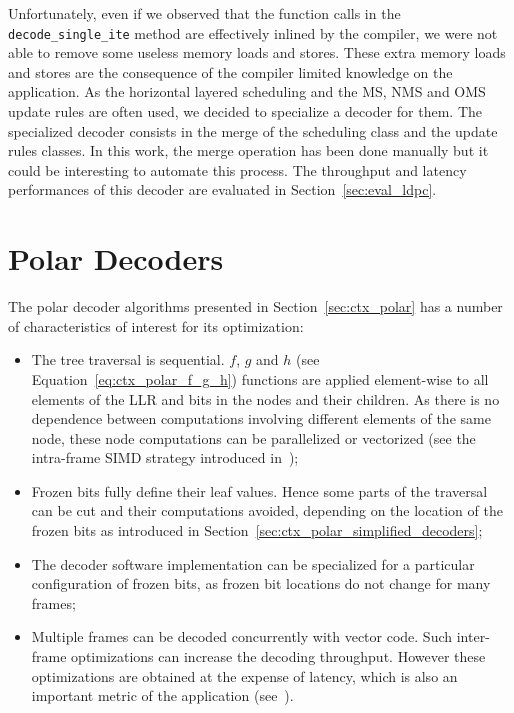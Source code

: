 Unfortunately, even if we observed that the function calls in the
\verb|decode_single_ite| method are effectively inlined by the compiler, we were
not able to remove some useless memory loads and stores. These extra memory
loads and stores are the consequence of the compiler limited knowledge on the
application. As the horizontal layered scheduling and the MS, NMS and OMS update
rules are often used, we decided to specialize a decoder for them. The
specialized decoder consists in the merge of the scheduling class and the update
rules classes. In this work, the merge operation has been done manually but it
could be interesting to automate this process. The throughput and latency
performances of this decoder are evaluated in Section~\ref{sec:eval_ldpc}.

\section{Polar Decoders}
\label{sec:opt_polar}

The polar decoder algorithms presented in Section~\ref{sec:ctx_polar} has a
number of characteristics of interest for its optimization:
\begin{itemize}
  \item The tree traversal is sequential. $f$, $g$ and $h$ (see
    Equation~\ref{eq:ctx_polar_f_g_h}) functions are applied element-wise to all
    elements of the LLR and bits in the nodes and their children. As there is no
    dependence between computations involving different elements of the same
    node, these node computations can be parallelized or vectorized (see the
    intra-frame SIMD strategy introduced in~\cite{Giard2014});
  \item Frozen bits fully define their leaf values. Hence some parts of the
    traversal can be cut and their computations avoided, depending on the
    location of the frozen bits as introduced in
    Section~\ref{sec:ctx_polar_simplified_decoders};
  \item The decoder software implementation can be specialized for a particular
    configuration of frozen bits, as frozen bit locations do not change for many
    frames;
  \item Multiple frames can be decoded concurrently with vector code. Such
    inter-frame optimizations can increase the decoding throughput. However
    these optimizations are obtained at the expense of latency, which is also an
    important metric of the application (see~\cite{LeGal2015a}).
\end{itemize}

